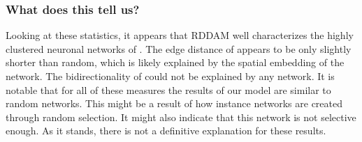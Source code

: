 \subsubsection{What does this tell us?} Looking at these statistics, it appears that RDDAM well characterizes the highly clustered neuronal networks of \ce. The edge distance of \ce appears to be only slightly shorter than random, which is likely explained by the spatial embedding of the network. The bidirectionality of \ce could not be explained by any network. 
It is notable that for all of these measures the results of our model are similar to random networks. This might be a result of how instance networks are created through random selection. It might also indicate that this network is not selective enough. As it stands, there is not a definitive explanation for these results.